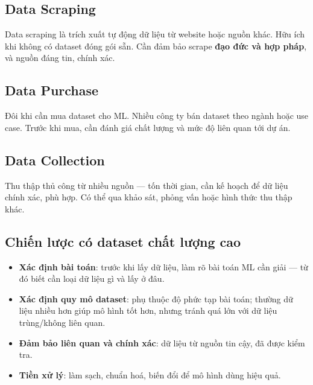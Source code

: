 \subsection{Data Scraping}

\begin{ynghia}[title={Scrape dữ liệu}]
Data scraping là trích xuất tự động dữ liệu từ website hoặc nguồn khác.
Hữu ích khi không có dataset đóng gói sẵn.
Cần đảm bảo scrape \textbf{đạo đức và hợp pháp}, và nguồn đáng tin, chính xác.
\end{ynghia}

\subsection{Data Purchase}

\begin{ynghia}[title={Mua dataset}]
Đôi khi cần mua dataset cho ML.
Nhiều công ty bán dataset theo ngành hoặc use case.
Trước khi mua, cần đánh giá chất lượng và mức độ liên quan tới dự án.
\end{ynghia}

\subsection{Data Collection}

\begin{ynghia}[title={Thu thập thủ công}]
Thu thập thủ công từ nhiều nguồn --- tốn thời gian, cần kế hoạch để dữ liệu chính xác, phù hợp.
Có thể qua khảo sát, phỏng vấn hoặc hình thức thu thập khác.
\end{ynghia}

\subsection{Chiến lược có dataset chất lượng cao}

\begin{phuongphap}[title={Sau khi chọn nguồn, cần đảm bảo chất lượng và liên quan}]
\begin{itemize}
  \item \textbf{Xác định bài toán}: trước khi lấy dữ liệu, làm rõ bài toán ML cần giải --- từ đó biết cần loại dữ liệu gì và lấy ở đâu.
  \item \textbf{Xác định quy mô dataset}: phụ thuộc độ phức tạp bài toán; thường dữ liệu nhiều hơn giúp mô hình tốt hơn, nhưng tránh quá lớn với dữ liệu trùng/không liên quan.
  \item \textbf{Đảm bảo liên quan và chính xác}: dữ liệu từ nguồn tin cậy, đã được kiểm tra.
  \item \textbf{Tiền xử lý}: làm sạch, chuẩn hoá, biến đổi để mô hình dùng hiệu quả.
\end{itemize}
\end{phuongphap}
